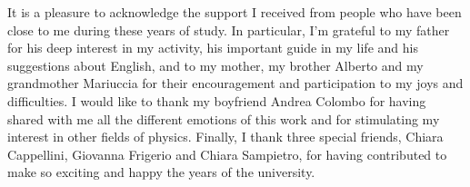 \documentclass[a4paper,12pt]{report}
\begin{document}
It is a pleasure to acknowledge the support I received from people who have been close to me during these years of
study. In particular, I'm grateful to my father for his deep interest in my activity, his important guide in my
life and his suggestions about English, and to my mother, my brother Alberto and my grandmother Mariuccia for
their encouragement and participation to my joys and difficulties. I would like to thank my boyfriend Andrea
Colombo for having shared with me all the different emotions of this work and for stimulating my interest in
other fields of physics. Finally, I thank three special friends, Chiara Cappellini, Giovanna Frigerio and Chiara
Sampietro, for having contributed to make so exciting and happy the years of the university.



\newpage
\end{document}

